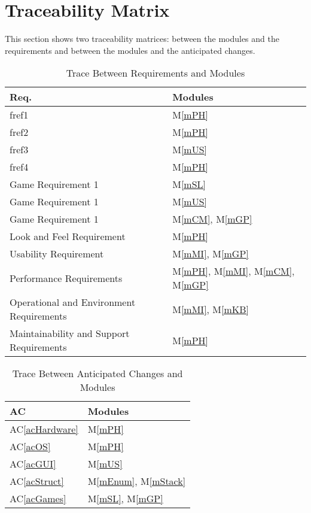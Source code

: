 \documentclass[12pt, titlepage]{article}
\newcommand{\acref}[1]{AC\ref{#1}}
\newcommand{\mref}[1]{M\ref{#1}}
\begin{document}
	\section{Traceability Matrix} \label{SecTM}
	This section shows two traceability matrices: between the modules and the
	requirements and between the modules and the anticipated changes.
	\begin{table}[H]
		\centering
		\begin{tabular}{p{} p{}}
			\toprule
			\textbf{Req.} & \textbf{Modules}\\
			\midrule
			fref1 & \mref{mPH}\\
			fref2 & \mref{mPH}\\
			fref3 & \mref{mUS}\\
			fref4 & \mref{mPH}\\
			Game Requirement 1 & \mref{mSL}\\
			Game Requirement 1 & \mref{mUS}\\
			Game Requirement 1 & \mref{mCM}, \mref{mGP}\\
			Look and Feel Requirement & \mref{mPH} \\
			Usability Requirement & \mref{mMI}, \mref{mGP}\\
			Performance Requirements & \mref{mPH}, \mref{mMI}, \mref{mCM}, 
			\mref{mGP}\\
			Operational and Environment Requirements & \mref{mMI}, \mref{mKB}\\
			Maintainability and Support Requirements & \mref{mPH}\\
			\bottomrule
		\end{tabular}
		\caption{Trace Between Requirements and Modules}
		\label{TblRT}
	\end{table}
	\begin{table}[H]
		\centering
		\begin{tabular}{p{} p{}}
			\toprule
			\textbf{AC} & \textbf{Modules}\\
			\midrule
			\acref{acHardware} & \mref{mPH}\\
			\acref{acOS} & \mref{mPH}\\
			\acref{acGUI} & \mref{mUS}\\
			\acref{acStruct} & \mref{mEnum}, \mref{mStack}\\
			\acref{acGames} & \mref{mSL}, \mref{mGP}\\
			\bottomrule
		\end{tabular}
		\caption{Trace Between Anticipated Changes and Modules}
		\label{TblACT}
	\end{table}
\end{document}
